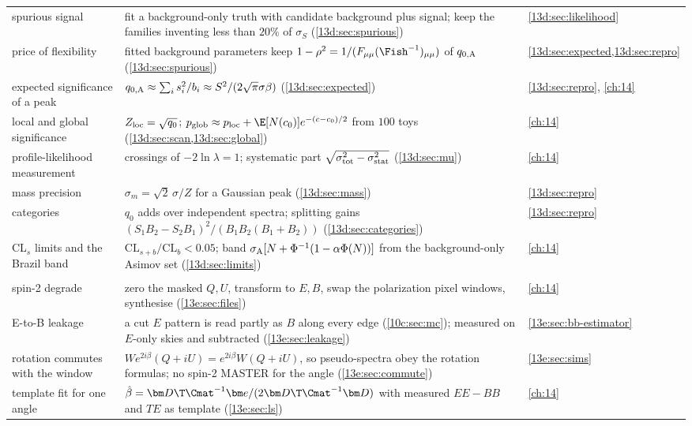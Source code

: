 \begin{xltabular}{\linewidth}{@{}>{\raggedright\arraybackslash}p{2.6cm}
  >{\raggedright\arraybackslash}X >{\raggedright\arraybackslash}p{2.5cm}@{}}
spurious signal & fit a background-only truth with candidate background plus signal; keep the families inventing less than $20\%$ of $\sigma_S$ (\cref{13d:sec:spurious}) & \cref{13d:sec:likelihood}\\
price of flexibility & fitted background parameters keep $1-\rho^2=1/(F_{\mu\mu}(\Fish^{-1})_{\mu\mu})$ of $q_{0,\rm A}$ (\cref{13d:sec:spurious}) & \cref{13d:sec:expected,13d:sec:repro}\\
expected significance of a peak & $q_{0,\rm A}\approx\sum_is_i^2/b_i\approx S^2/(2\sqrt\pi\sigma\beta)$ (\cref{13d:sec:expected}) & \cref{13d:sec:repro}, \cref{ch:14}\\
local and global significance & $Z_{\rm loc}=\sqrt{q_0}$; $p_{\rm glob}\approx p_{\rm loc}+\E[N(c_0)]e^{-(c-c_0)/2}$ from $100$ toys (\cref{13d:sec:scan,13d:sec:global}) & \cref{ch:14}\\
profile-likelihood measurement & crossings of $-2\ln\lambda=1$; systematic part $\sqrt{\sigma_{\rm tot}^2-\sigma_{\rm stat}^2}$ (\cref{13d:sec:mu}) & \cref{ch:14}\\
mass precision & $\sigma_m=\sqrt2\,\sigma/Z$ for a Gaussian peak (\cref{13d:sec:mass}) & \cref{13d:sec:repro}\\
categories & $q_0$ adds over independent spectra; splitting gains $(S_1B_2-S_2B_1)^2/(B_1B_2(B_1+B_2))$ (\cref{13d:sec:categories}) & \cref{13d:sec:repro}\\
CL$_s$ limits and the Brazil band & $\mathrm{CL}_{s+b}/\mathrm{CL}_b<0.05$; band $\sigma_{\rm A}[N+\Phi^{-1}(1-\alpha\Phi(N))]$ from the background-only Asimov set (\cref{13d:sec:limits}) & \cref{ch:14}\\
\midrule
{}\\
spin-2 degrade & zero the masked $Q,U$, transform to $E,B$, swap the polarization pixel windows, synthesise (\cref{13e:sec:files}) & \cref{ch:14}\\
E-to-B leakage & a cut $E$ pattern is read partly as $B$ along every edge (\cref{10c:sec:mc}); measured on $E$-only skies and subtracted (\cref{13e:sec:leakage}) & \cref{13e:sec:bb-estimator}\\
rotation commutes with the window & $W e^{2i\beta}(Q+iU)=e^{2i\beta}W(Q+iU)$, so pseudo-spectra obey the rotation formulas; no spin-2 MASTER for the angle (\cref{13e:sec:commute}) & \cref{13e:sec:sims}\\
template fit for one angle & $\hat\beta=\bm D\T\Cmat^{-1}\bm e/(2\bm D\T\Cmat^{-1}\bm D)$ with measured $EE-BB$ and $TE$ as template (\cref{13e:sec:ls}) & \cref{ch:14}\\

\end{xltabular}
